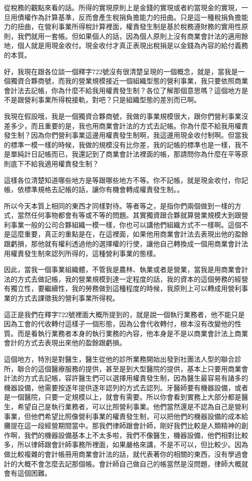 \documentclass[oneside,sub3section]{ctexbook}
\begin{document}
從稅務的觀點來看的話。所得的實現原則上是金錢的實現或者約當現金的實現，一旦用債權作為計算基準，反而會產生稅捐負擔能力的扭曲。只是這一種稅捐負擔能力的扭曲，在營利事業所得稅計算裡面，權責發生制是基於稅務遵財務的實用性原則，我們就用一套帳。但如果個人的話，因為個人原則上沒有商業會計法的適用餘地，個人就是用現金收付。現金收付才真正表現出稅捐是以金錢為內容的給付義務的本質。

好，我現在跟各位談一個釋字722號沒有很清楚呈現的一個概念，就是，當我是一個獨資合夥商號，而我的營業規模接近一個組織型態的營利事業，我只要依照商業會計法去記帳，你為什麼不給我用權責發生制？各位了解那個意思嗎？這個地方是不是跟營利事業所得稅接軌，對吧？只是組織型態的差別而已啊。

我現在假設哦，我是一個獨資合夥商號，我做的事業規模很大，跟你們營利事業沒差多少，而且重要的是，我也用商業會計法的方式去記帳。你為什麼不給我用權責發生制？因為你們營利事業這邊用權責發生制啊，我這邊用現金收付制啊。但當我的標準一模一樣的時候，我做的規模沒有比你差，我的記帳的標準也是一樣，我不是單純計日記帳而已，我還記到了商業會計法裡面的帳，那請問你為什麼在平等原則底下不給我適用權責發生制？

這樣各位清楚知道哪些地方是等跟哪些地方不等。你不記帳，就是現金收付，你記帳，依標準規格去記帳的話，讓你有機會轉成權責發生制。。

所以今天本質上相同的東西才同樣對待。等者等之，是指你們兩個做到一樣的方式，當然任何事物都會有等或不等的問題。其實獨資跟合夥就算營業規模大到跟營利事業一般的公司合夥組織一模一樣，你也可以講他們組織方式不一樣啊。這個不是這麼重要，真正的重點是在，在這裡面，如果他用商業會計法去表現出他的盈餘跟虧損，那他就有權利透過他的選擇權的行使，讓他自己轉換成一個用商業會計法用權責發生制來認列所得的，這種營利事業的態樣。

因此，當我一個事業組織體，不管我是農林、執業或者是營業，當我是用商業會計法的方式去做記帳，我的營業規模到達一定程度的話，我的資本的這個勞務的經營有獨立性，要繼續性，我的勞務做到這種程度的時候，我原則上可以轉成用營利事業的方式去課徵我的營利事業所得稅。

這正是我們在釋字722號裡面大概所提到的，就是說一個執行業務者，他不能只是因為工會的代收轉付這樣子一個形態，因為公會代收轉付，根本沒有改變他的性質。而是看執行業務者本身的執行業務的內容，他本身是不是以商業會計法上商業會計的方式去表現出來他的盈餘跟虧損。

這個地方，特別是對醫生，醫生從他的診所業務開始出發到社團法人型的聯合診所，聯合的這個醫療服務的提供，甚至是到大型醫院的提供，基本上只要用商業會計法的方式去記帳，容許醫生們可以選擇用權責發生制，因為醫生最容易有諸多的機器設備，他需要按逐年提供逐年認列的方式去認列。牙醫師要有機器設備，或者是一個醫院，只要一定規模以上，就會有需要。所以你會看到實務上大部分都是醫生，希望自己是執行業務者，可以比照營利事業。他們當然還是不認為自己是營利事業，但他們希望比照像營利事業的權責發生制，可以把他們的機器設備的成本給攤提在這一段經營期間當中。那我們律師跟會計師，剛好我們比較是人類精神的創作啊，我們的機器設備基本上不太多啦，我們不像醫生，機器設備，他們相對比較多，所以律師跟會計師事務所裡面，如果嚴格來講，不是不可以，但比較少。因為做比較複雜的會計帳冊用商業會計法的話，就代表著你的相關的東西，沒有學過會計的大概不會怎麼去記那個帳。會計師自己做自己的帳當然是沒問題，律師大概就會有這個困難。
\end{document}
